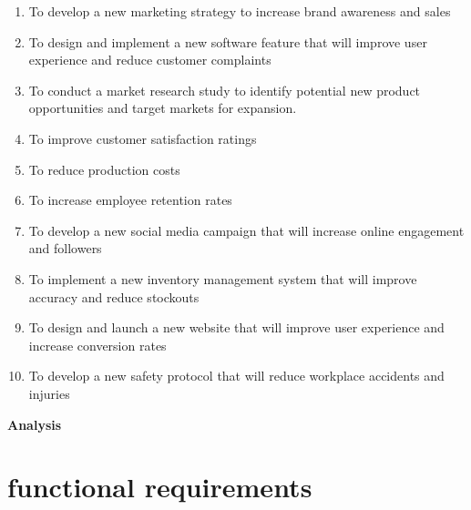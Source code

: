 \documentclass[a4paper,11pt]{article}
\begin{document}
\begin{center}
\begin{center}
\vspace{1cm}
 \begin{enumerate}
     \item  To develop a new marketing strategy to increase brand awareness and sales  \\
     \item  To design and implement a new software feature that will improve user experience and reduce customer complaints \\
     \item To conduct a market research study to identify potential new product opportunities and target markets for expansion.\\
     \item To improve customer satisfaction ratings  \\
     \item To reduce production costs\\
     \item To increase employee retention rates \\
     \item To develop a new social media campaign that will increase online engagement and followers  \\
     \item To implement a new inventory management system that will improve accuracy and reduce stockouts \\
     \item To design and launch a new website that will improve user experience and increase conversion rates  \\
     \item  To develop a new safety protocol that will reduce workplace accidents and injuries \\
 \end{enumerate}

\end{center}
\newpage

\vspace{0.5cm}
\begin{center}
    \textbf{\Large Analysis}
    \vspace{1cm}

    
\end{center}

\vspace{0.5cm}

 \section{functional requirements}


\end{center}
\end{document}
